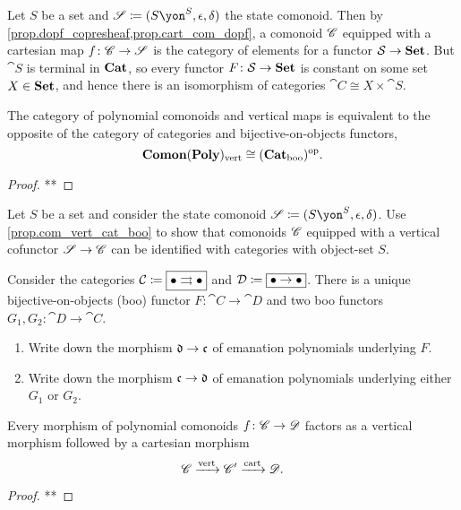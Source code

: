 \documentclass[DynamicalBook]{subfiles}
\begin{document}
\begin{example}
Let $S$ be a set and $\com{S}\coloneqq(S\yon^S,\epsilon,\delta)$ the state comonoid. Then by \cref{prop.dopf_copresheaf,prop.cart_com_dopf}, a comonoid $\mathscr{C}$ equipped with a cartesian map $f\colon\mathscr{C}\to\mathscr{S}$ is the category of elements for a functor $\mathcal{S}\to\textbf{Set}$. But $\cat{S}$ is terminal in $\textbf{Cat}$, so every functor $F\colon \mathcal{S}\to\textbf{Set}$ is constant on some set $X\in\textbf{Set}$, and hence there is an isomorphism of categories $\cat{C}\cong X\times \cat{S}$.
\end{example}

\begin{proposition}\label{prop.com_vert_cat_boo}
The category of polynomial comonoids and vertical maps is equivalent to the opposite of the category of categories and bijective-on-objects functors,
\[
\textbf{Comon}(\textbf{Poly})_{\text{vert}}\cong(\textbf{Cat}_{\text{boo}})^{\textnormal{op}}.
\]
\end{proposition}
\begin{proof}
**
\end{proof}

\begin{exercise}
Let $S$ be a set and consider the state comonoid $\com{S}\coloneqq(S\yon^S,\epsilon,\delta)$. Use \cref{prop.com_vert_cat_boo} to show that comonoids $\mathscr{C}$ equipped with a vertical cofunctor $\mathscr{S}\to\mathscr{C}$ can be identified with categories with object-set $S$.
\end{exercise}

\begin{exercise}
Consider the categories $\mathcal{C}\coloneqq\fbox{$\bullet\rightrightarrows\bullet$}$ and $\mathcal{D}\coloneqq\fbox{$\bullet\to\bullet$}$. There is a unique bijective-on-objects (boo) functor $F\colon\cat{C}\to\cat{D}$ and two boo functors $G_1,G_2\colon\cat{D}\to\cat{C}$.
\begin{enumerate}
	\item Write down the morphism $\mathfrak{d}\to\mathfrak{c}$ of emanation polynomials underlying $F$.
	\item Write down the morphism $\mathfrak{c}\to\mathfrak{d}$ of emanation polynomials underlying either $G_1$ or $G_2$.
\qedhere
\end{enumerate}
\end{exercise}

\begin{proposition}
Every morphism of polynomial comonoids $f\colon\mathscr{C}\to\mathscr{D}$ factors as a vertical morphism followed by a cartesian morphism
\[
\mathscr{C}\xrightarrow{\text{vert}}\mathscr{C}'\xrightarrow{\text{cart}}\mathscr{D}.
\]
\end{proposition}
\begin{proof}
**
\end{proof}
\end{document}
